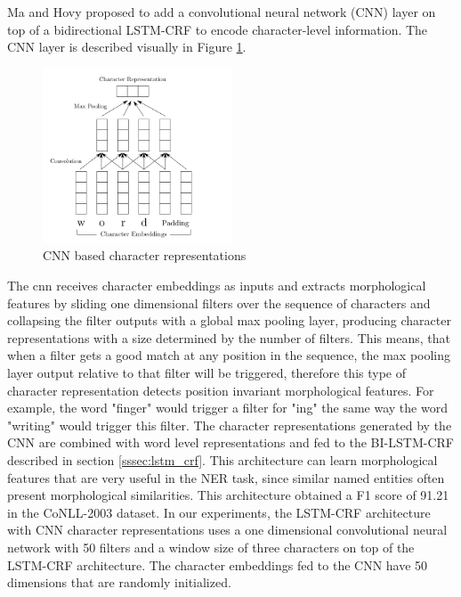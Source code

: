 \documentclass{nle}
\begin{document}
Ma and Hovy  proposed to add a convolutional neural network (CNN) layer 
on top of a bidirectional LSTM-CRF to encode character-level information. The CNN
layer is described visually in Figure \ref{fig:cnn}.

\begin{figure}[h]
  \centering
  \includegraphics[width=0.5\textwidth]{pics/cnn}
  \caption{CNN based character representations}
  \label{fig:cnn}
\end{figure}

The \gls{cnn} receives character embeddings as inputs and extracts
morphological features by sliding one dimensional filters over the sequence of characters 
and collapsing the filter outputs with a global max pooling layer, producing character
representations with a size determined by the number of filters. 
This means, that when a filter gets a good match at any position in the sequence, the 
max pooling layer output relative to that filter will be triggered, therefore this type of 
character representation detects position invariant morphological features. For example,
the word "finger" would trigger a filter for "ing" the same way the word "writing" would
trigger this filter. The character 
representations generated by the CNN are combined with word level representations 
and fed to the BI-LSTM-CRF described in section \ref{sssec:lstm_crf}.
This architecture can learn morphological features that are very
useful in the NER task, since similar named entities often present morphological similarities. 
This architecture obtained a F1 score of 91.21 in the CoNLL-2003 dataset. In our experiments, 
the LSTM-CRF architecture with CNN character representations uses a one dimensional convolutional 
neural network with 50 filters and a window size of three characters on top of the LSTM-CRF 
architecture. The character embeddings fed to the CNN have 50 dimensions that are randomly 
initialized.
\end{document}
